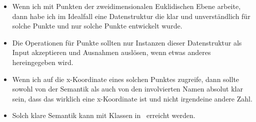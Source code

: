 \documentclass[aspectratio=169,mathserif,notheorems]{beamer}%
\begin{document}
\begin{frame}
\begin{itemize}
%
\item<15-> Wenn ich mit Punkten der zweidimensionalen Euklidischen Ebene arbeite, dann habe ich im Idealfall eine Datenstruktur die klar und unverständlich für solche Punkte und nur solche Punkte entwickelt wurde.%
%
\item<16-> Die Operationen für Punkte sollten nur Instanzen dieser Datenstruktur als Input akzeptieren und Ausnahmen auslösen, wenn etwas anderes hereingegeben wird.%
%
\item<17-> Wenn ich auf die x\nobreakdashes-Koordinate eines solchen Punktes zugreife, dann sollte sowohl von der Semantik als auch von den involvierten Namen absolut klar sein, dass das wirklich eine x\nobreakdashes-Koordinate ist und nicht irgendeine andere Zahl.%
%
\item<18-> Solch klare Semantik kann mit Klassen in \python\ erreicht werden.%
\end{itemize}%
\end{frame}%
%
%
\end{document}
